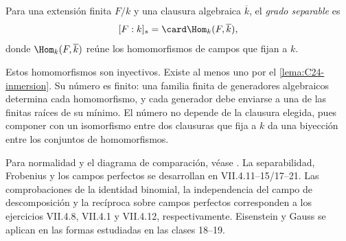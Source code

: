\par\noindent\begin{minipage}{\linewidth}
\begin{defi}
Para una extensión finita $F/k$ y una clausura algebraica $\overline k$, el \emph{grado separable} es
\[
[F:k]_s=\card\Hom_k(F,\overline k),
\]
donde $\Hom_k(F,\overline k)$ reúne los homomorfismos de campos que fijan a $k$.
\end{defi}
Estos homomorfismos son inyectivos. Existe al menos uno por el \cref{lema:C24-inmersion}. Su número es finito: una familia finita de generadores algebraicos determina cada homomorfismo, y cada generador debe enviarse a una de las finitas raíces de su mínimo. El número no depende de la clausura elegida, pues componer con un isomorfismo entre dos clausuras que fija a $k$ da una biyección entre los conjuntos de homomorfismos.
\begin{obs}
Para normalidad y el diagrama de comparación, véase \citet[cap.~VII, definición 4.7 y teorema 4.8]{aluffi2009}. La separabilidad, Frobenius y los campos perfectos se desarrollan en VII.4.11--15/17--21. Las comprobaciones de la identidad binomial, la independencia del campo de descomposición y la recíproca sobre campos perfectos corresponden a los ejercicios VII.4.8, VII.4.1 y VII.4.12, respectivamente. Eisenstein y Gauss se aplican en las formas estudiadas en las clases 18--19.
\end{obs}
\end{minipage}\par

